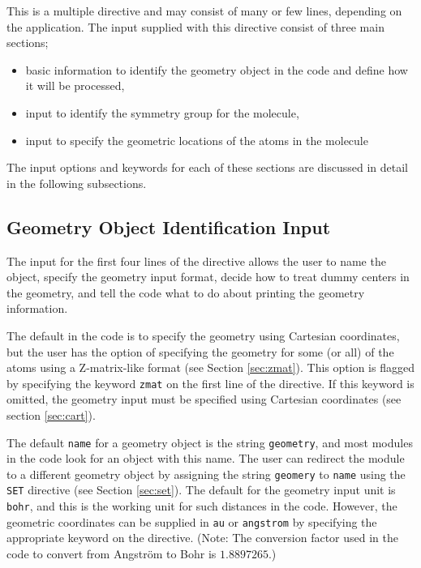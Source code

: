 This is a multiple directive and may consist of many or few lines,
depending on the application.  The input supplied with this directive
consist of three main sections; 

\begin{itemize}
\item basic information to identify the geometry object in the code and
define how it will be processed,
\item input to identify the symmetry group for the molecule,
\item input to specify the geometric locations of the atoms in the molecule
\end{itemize}

The input options and keywords for each of these sections are
discussed in detail in the following subsections.  

\subsection{Geometry Object Identification Input}

The input for the first four lines of the directive allows the user to name 
the object, specify the geometry input format, decide how to treat dummy
centers in the geometry, and tell the code what to do about printing 
the geometry information.

The default in the code is to specify the geometry using
Cartesian coordinates, but the user has the option of specifying
the geometry for some (or all) of the atoms using a Z-matrix-like format
(see Section \ref{sec:zmat}).
This option is flagged by specifying the keyword \verb+zmat+ on the
first line of the directive.  If this keyword is omitted, the geometry
input must be specified using Cartesian coordinates (see section 
\ref{sec:cart}).

The default \verb+name+ for a geometry object is the string \verb+geometry+,
and most modules in the code look for an object with this name.  
The user can redirect the module to a different geometry object by assigning
the string \verb+geomery+ to \verb+name+ using the \verb+SET+ directive 
(see Section \ref{sec:set}).  The default for the geometry input unit
is \verb+bohr+, and this is the working unit for such distances in the code.
However, the geometric coordinates can be supplied in \verb+au+ or 
\verb+angstrom+ by specifying the appropriate keyword on the directive.
(Note: The conversion factor used in the code to convert from Angstr\"{o}m 
to Bohr is $1.8897265$.)

